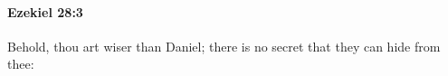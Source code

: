 
		\paragraph{Ezekiel 28:3} %
			\label{EZEKIEL-28-3}

			Behold, thou art wiser than Daniel; there is no secret that they can hide from thee:


